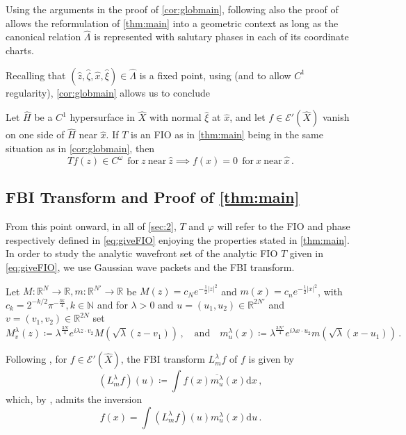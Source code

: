 \documentclass[
	fontsize=11pt, 
	twoside=false, 
	abstract=true, 
	a4paper,
]{scrartcl}
\newcommand{\RR}{\mathbb{R}}
\newcommand{\dd}{\mathrm{d}}
\newcommand{\abs}[1]{\left\lvert#1\right\rvert}
\newcommand{\an}{\quad\text{and}\quad}
\begin{document}
\begin{remark}
	Using the arguments in the proof of \cref{cor:globmain}, following also the proof of \cite[Thm.~5.1]{2306.05906v1} allows the reformulation of \cref{thm:main} into a geometric context as long as the canonical relation $\hat\Lambda$ is represented with salutary phases in each of its coordinate charts.
\end{remark}

Recalling that $(\hat z, \hat \zeta, \hat x, \hat \xi) \in \hat\Lambda$ is a fixed point, using \cite[Thm.~8.5.6']{hoermander1} (and \cite[Prop.~8.5.8]{hoermander1} to allow $C^1$ regularity), \cref{cor:globmain} allows us to conclude
\begin{theorem}\label{thm:hypside}
	Let $\hat H$ be a $C^1$ hypersurface in $\hat X$ with normal $\hat\xi$ at $\hat x$, and let $f\in\mathcal{E}'(\hat X)$ vanish on one side of $\hat H$ near $\hat x$. If $T$ is an FIO as in \cref{thm:main} being in the same situation as in \cref{cor:globmain}, then %
	\[
		Tf(z) \in C^\omega\ \ \text{for}\ z\ \text{near}\ \hat z \implies f(x)=0\ \ \text{for}\ x\ \text{near}\ \hat x\,.
	\]
\end{theorem} 

\subsection{FBI Transform and Proof of \cref{thm:main}}\label{sec:FBI}

From this point onward, in all of \cref{sec:2}, $T$ and $\varphi$ will refer to the FIO and phase respectively defined in \cref{eq:giveFIO} enjoying the properties stated in \cref{thm:main}. In order to study the analytic wavefront set of the analytic FIO $T$ given in \cref{eq:giveFIO}, we use Gaussian wave packets and the FBI transform.

Let $M \colon \RR^{N} \to \RR, m\colon \RR^{N'}\to \RR$ be $M(z) = c_{N} e^{-\frac{1}{2}\abs{z}^2}$ and $m(x) = c_{n} e^{-\frac{1}{2}\abs{x}^2}$, with $c_{k} = 2^{-{k}/2}\pi^{-\frac{3k}{4}}, k\in\mathbb{N}$ and for $\lambda >0$ and $u = (u_1,u_2) \in \RR^{2N'}$ and $v =(v_1,v_2) \in \RR^{2N}$ set 
\[
	M_{v}^\lambda(z) \coloneqq \lambda^{\frac{3N}{4}}e^{i\lambda z\cdot v_2}M(\sqrt{\lambda}(z-v_1))\,,\an m_{u}^\lambda(x) \coloneqq \lambda^{\frac{3N'}{4}}e^{i\lambda x\cdot u_2}m(\sqrt{\lambda}(x-u_1))\,.
\]

Following \cite[\S~3.1]{MR1872698}, for $f\in \mathcal{E}'(\hat X)$, the FBI transform $L_m^\lambda f$ of $f$ is given by
\[
	(L_m^\lambda f)(u) \coloneqq \int f(x)\overline{m_{u}^\lambda}(x)\dd x\,,
\]
which, by \cite[Prop.~3.1.6]{MR1872698}, admits the inversion
\[
	f(x) = \int (L_m^\lambda f)(u)m_u^\lambda(x) \dd u\,.
\]
\end{document}
